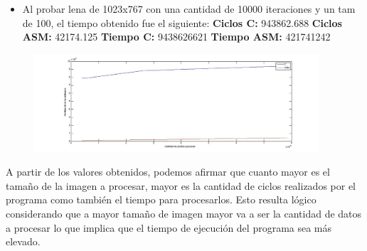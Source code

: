 \documentclass[10pt, a4paper]{article}
\begin{document}
\begin{itemize}
\begin{itemize}
\item{Al probar lena de 1023x767 con una cantidad de 10000 iteraciones y un tam de 100, el tiempo obtenido fue el siguiente:\newline
\newline
\textbf{Ciclos C:}                  943862.688\newline
\vspace{0.15cm}
\textbf{Ciclos ASM:}               42174.125\newline
\textbf{Tiempo C:}                 9438626621\newline
\textbf{Tiempo ASM:}               421741242\newline}

\end{itemize}

\begin{figure}[H] %
\begin{center}
\includegraphics[width=300pt]{./ciclosRecortar.jpg}
\end{center}
\end{figure}

A partir de los valores obtenidos, podemos afirmar que cuanto mayor es el tamaño de la imagen a procesar, mayor es la cantidad de ciclos realizados por el programa como también el tiempo para procesarlos. Esto resulta lógico considerando que a mayor tamaño de imagen mayor va a ser la cantidad de datos a procesar lo que implica que el tiempo de ejecución del programa sea más elevado.


\end{itemize}
\end{document}
